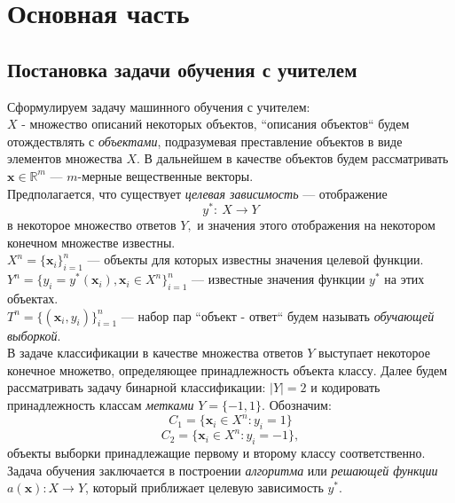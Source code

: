\documentclass[%
bachelor,    %
subf,        %
href,        %
colorlinks,  %
]{disser}
\let\vec=\mathbf
\begin{document}
\section{Основная часть}
\subsection{Постановка задачи обучения с учителем}
Сформулируем задачу машинного обучения с учителем:\\
$X$ - множество описаний некоторых объектов, ``описания объектов`` будем отождествлять с \textit{объектами}, подразумевая преставление объектов в виде элементов множества $X$. В дальнейшем в качестве объектов будем рассматривать $\vec{x} \in \mathbb{R}^m$ --- $m$-мерные вещественные векторы.\\
Предполагается, что существует \textit{целевая зависимость} — отображение $$y^{*}:\: X\to Y$$ в некоторое множество ответов $Y,$ и значения этого отображения на некотором конечном множестве известны.\\
$X^n = \{ \vec{x}_i \}_{i=1}^n$ --- объекты для которых известны значения целевой функции. $Y^n = \{y_i = y^{*}(\vec{x}_i), \vec{x}_i \in X^n \}_{i=1}^n$ --- известные значения функции $y^{*}$ на этих объектах.\\
$T^n=\{(\vec{x}_i,y_i)\}_{i=1}^n$ --- набор пар ``объект - ответ`` будем называть \textit{обучающей выборкой}.\\
В задаче классификации в качестве множества ответов $Y$ выступает некоторое конечное множетво, определяющее принадлежность объекта классу. Далее будем рассматривать задачу бинарной классификации: $|Y|=2$ и кодировать принадлежность классам \textit{метками} $Y=\{-1,1\}.$ Обозначим:
$$C_1 = \{\vec{x}_i \in X^n : y_i = 1\}$$
$$C_2 = \{\vec{x}_i \in X^n :y_i = -1\},$$
объекты выборки принадлежащие первому и второму классу соответственно.
Задача обучения заключается в построении \textit{алгоритма} или \textit{решающей функции}  $a(\vec{x}): X \to Y$, который приближает целевую зависимость $y^{*}$.\cite{supervised_learning}
\end{document}
